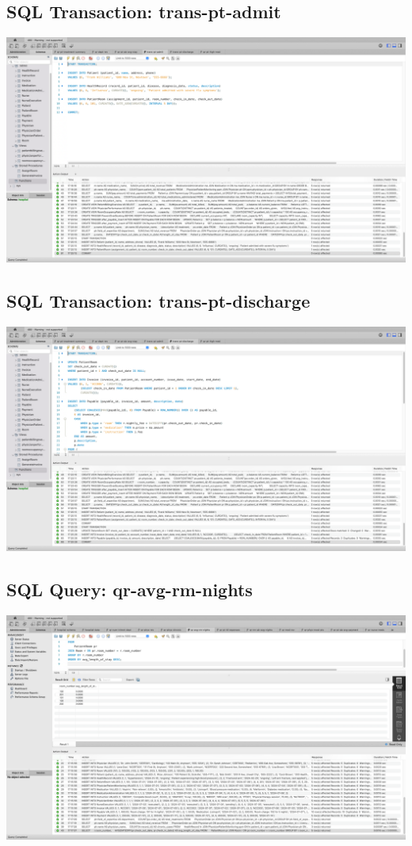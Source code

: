 \documentclass[a4paper,11pt]{article}
\theoremstyle{mytheor}
\begin{document}
\subsection{SQL Transaction: trans-pt-admit}
\includegraphics[width=\textwidth]{Screenshots/SCR-20240727-phdv.png}

\subsection{SQL Transaction: trans-pt-discharge}
\includegraphics[width=\textwidth]{Screenshots/SCR-20240727-phfr.png}

\subsection{SQL Query: qr-avg-rm-nights}
\includegraphics[width=\textwidth]{Screenshots/SCR-20240727-pelj.png}
\end{document}
